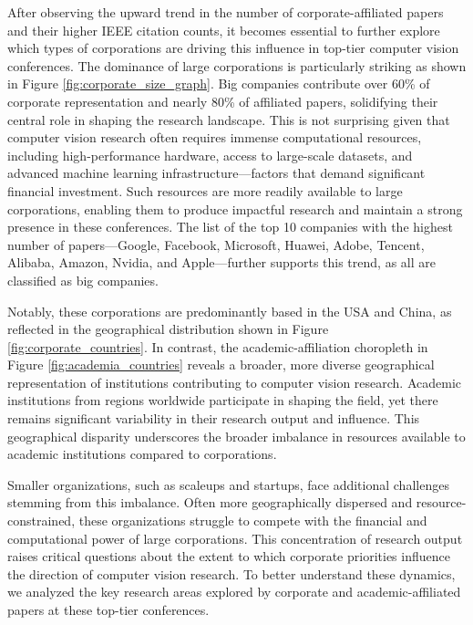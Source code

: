 \documentclass{article}
\begin{document}
After observing the upward trend in the number of corporate-affiliated papers and their higher IEEE citation counts, it becomes essential to further explore which types of corporations are driving this influence in top-tier computer vision conferences. The dominance of large corporations is particularly striking as shown in Figure \ref{fig:corporate_size_graph}. Big companies contribute over 60\% of corporate representation and nearly 80\% of affiliated papers, solidifying their central role in shaping the research landscape. This is not surprising given that computer vision research often requires immense computational resources, including high-performance hardware, access to large-scale datasets, and advanced machine learning infrastructure—factors that demand significant financial investment. Such resources are more readily available to large corporations, enabling them to produce impactful research and maintain a strong presence in these conferences. The list of the top 10 companies with the highest number of papers—Google, Facebook, Microsoft, Huawei, Adobe, Tencent, Alibaba, Amazon, Nvidia, and Apple—further supports this trend, as all are classified as big companies. 

Notably, these corporations are predominantly based in the USA and China, as reflected in the geographical distribution shown in Figure \ref{fig:corporate_countries}. In contrast, the academic-affiliation choropleth in Figure \ref{fig:academia_countries} reveals a broader, more diverse geographical representation of institutions contributing to computer vision research. Academic institutions from regions worldwide participate in shaping the field, yet there remains significant variability in their research output and influence. This geographical disparity underscores the broader imbalance in resources available to academic institutions compared to corporations.

Smaller organizations, such as scaleups and startups, face additional challenges stemming from this imbalance. Often more geographically dispersed and resource-constrained, these organizations struggle to compete with the financial and computational power of large corporations. This concentration of research output raises critical questions about the extent to which corporate priorities influence the direction of computer vision research. To better understand these dynamics, we analyzed the key research areas explored by corporate and academic-affiliated papers at these top-tier conferences. 
\end{document}
